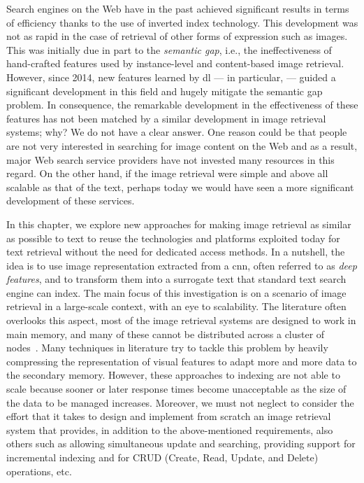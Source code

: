 Search engines on the Web have in the past achieved significant results in terms of efficiency thanks to the use of inverted index technology.
This development was not as rapid in the case of retrieval of other forms of expression such as images.
This was initially due in part to the \emph{semantic gap}, i.e., the ineffectiveness of hand-crafted features used by instance-level and content-based image retrieval.
However, since 2014, new features learned by \acrlong{dl} --- in particular,  --- guided a significant development in this field and hugely mitigate the semantic gap problem.
In consequence, the remarkable development in the effectiveness of these features has not been matched by a similar development in image retrieval systems; why?
We do not have a clear answer.
One reason could be that people are not very interested in searching for image content on the Web and as a result, major Web search service providers have not invested many resources in this regard.
On the other hand, if the image retrieval were simple and above all scalable as that of the text, perhaps today we would have seen a more significant development of these services.

In this chapter, we explore new approaches for making image retrieval as similar as possible to text to reuse the technologies and platforms exploited today for text retrieval without the need for dedicated access methods.
In a nutshell, the idea is to use image representation extracted from a \gls{cnn}, often referred to as \emph{deep features}, and to transform them into a surrogate text that standard text search engine can index.
The main focus of this investigation is on a scenario of image retrieval in a large-scale context, with an eye to scalability.
The literature often overlooks this aspect, most of the image retrieval systems are designed to work in main memory, and many of these cannot be distributed across a cluster of nodes~\cite{navarro2016new}.
Many techniques in literature try to tackle this problem by heavily compressing the representation of visual features to adapt more and more data to the secondary memory.
However, these approaches to indexing are not able to scale because sooner or later response times become unacceptable as the size of the data to be managed increases.
Moreover, we must not neglect to consider the effort that it takes to design and implement from scratch an image retrieval system that provides, in addition to the above-mentioned requirements, also others such as allowing simultaneous update and searching, providing support for incremental indexing and for CRUD (Create, Read, Update, and Delete) operations, etc.

